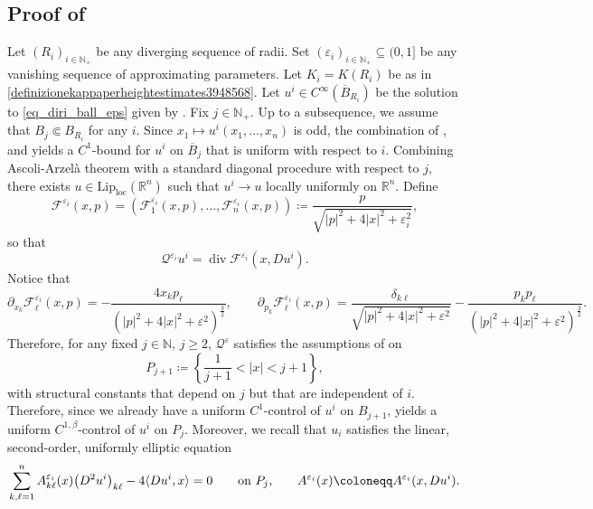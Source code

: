 \documentclass[11pt]{amsart}
\renewcommand{\geq}{\geqslant}
\renewcommand{\le}{<}
\newcommand{\rr}{{\mathbb{R}}}
\newcommand{\eps}{\varepsilon}
\newcommand{\Qe}{\mathcal Q^\eps}
\newcommand{\Qei}{\mathcal Q^{\eps_i}}
\newcommand{\Aei}{A^{\eps_i}}
\newcommand{\flui}{\mathcal F^{\eps_i}}
\DeclareMathOperator{\divv}{div}
\theoremstyle{definition}
\theoremstyle{remark}
\numberwithin{equation}{section}
\begin{document}
\subsection{Proof of }
Let $(R_i)_{i\in \mathbb N_+}$ be any diverging sequence of radii. Set  $(\eps_i)_{i\in \mathbb N_+}\subseteq(0,1]$ be any vanishing sequence of approximating parameters. Let $K_i=K(R_i)$ be as in \eqref{definizionekappaperheightestimates3948568}. Let $u^i\in C^\infty(\overline B_{R_i})$ be the solution to \eqref{eq_diri_ball_eps} given by . Fix $j\in\mathbb N_+$. Up to a subsequence, we assume that $B_j\Subset B_{R_i}$ for any $i$. Since $x_1\mapsto u^i(x_1,\ldots,x_n)$ is odd, the combination of  ,   and  yields a $C^1$-bound for $u^i$ on $\overline B_j$ that is uniform with respect to $i$. Combining Ascoli-Arzelà theorem with a standard diagonal procedure with respect to $j$, there exists $u\in\mathrm{Lip}_\mathrm{loc}(\rr^n)$ such that $u^i\to u$ locally uniformly on $\rr^n$. Define 
\begin{equation*}
    \flui(x,p) =(\flui_1(x,p),\ldots,\flui_n(x,p))\coloneqq \frac{p}{\sqrt{|p|^2+4|x|^2+\eps_i^2}},
\end{equation*}
so that
\begin{equation*}
    \Qei u^i=\divv\flui(x,Du^i).
\end{equation*}
Notice that
\begin{equation*}
    \partial _{x_k}\flui_\ell(x,p)=-\frac{4x_kp_\ell}{\left(|p|^2+4|x|^2+\eps^2\right)^\frac{3}{2}},\qquad  \partial _{p_k}\flui_\ell(x,p)=\frac{\delta_{k\ell}}{\sqrt{|p|^2+4|x|^2+\eps^2}}-\frac{p_kp_\ell}{\left(|p|^2+4|x|^2+\eps^2\right)^\frac{3}{2}}.
\end{equation*}
Therefore, for any fixed $j\in\mathbb N$, $j\geq 2$, $\Qe$ satisfies the assumptions of \cite[Theorem 13.2]{MR1814364} on 
\begin{equation*}
    P_{j+1}\coloneq \left\{\frac{1}{j+1}\le|x|\le j+1\right\},
\end{equation*}
with structural constants that depend on $j$ but that are independent of $i$. Therefore, since we already have a uniform $C^1$-control of $u^i$ on $B_{j+1}$, \cite[Theorem 13.2]{MR1814364} yields a uniform $C^{1,\beta}$-control of $u^i$ on $P_j$. Moreover, we recall that $u_i$ satisfies the linear, second-order, uniformly elliptic equation 
\begin{equation}\label{exlininririririiririr}
\sum_{k,\ell=1}^n\mathcal \mathcal A^{\eps_i}_{k\ell}(x)\big(D^2 u^i\big)_{k\ell}-4 \langle Du^i,x\rangle=0\qquad \text{on $P_j$,}\qquad \Aei(x)\coloneqq A^{\eps_i}(x,Du^i).
\end{equation}
\end{document}
